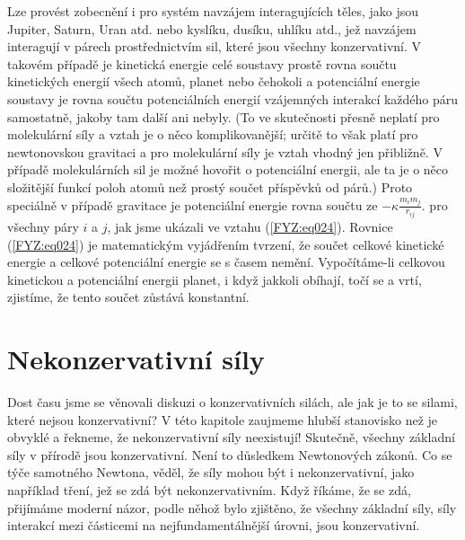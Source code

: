 {    Lze provést zobecnění i pro systém navzájem interagujících těles, jako jsou Jupiter, Saturn, 
    Uran atd. nebo kyslíku, dusíku, uhlíku atd., jež navzájem interagují v párech prostřednictvím 
    sil, které jsou všechny konzervativní. V takovém případě je kinetická energie celé soustavy 
    prostě rovna součtu kinetických energií všech atomů, planet nebo čehokoli a potenciální energie 
    soustavy je rovna součtu potenciálních energií vzájemných interakcí každého páru samostatně, 
    jakoby tam další ani nebyly. (To ve skutečnosti přesně neplatí pro molekulární síly a vztah je 
    o něco komplikovanější; určitě to však platí pro newtonovskou gravitaci a pro molekulární síly 
    je vztah vhodný jen přibližně. V případě molekulárních sil je možné hovořit o potenciální 
    energii, ale ta je o něco složitější funkcí poloh atomů než prostý součet příspěvků od párů.) 
    Proto speciálně v případě gravitace je potenciální energie rovna součtu ze \(- \kappa 
    \frac{m_im_j}{r_{ij}}.\) pro všechny páry \(i\) a \(j\), jak jsme ukázali ve vztahu 
    (\ref{FYZ:eq024}). Rovnice (\ref{FYZ:eq024}) je matematickým vyjádřením tvrzení, že součet 
    celkové kinetické energie a celkové potenciální energie se s časem nemění. Vypočítáme-li 
    celkovou kinetickou a potenciální energii planet, i když jakkoli obíhají, točí se a vrtí, 
    zjistíme, že tento součet zůstává konstantní.
    
  \section{Nekonzervativní síly}
    Dost času jsme se věnovali diskuzi o konzervativních silách, ale jak je to se silami, které 
    nejsou konzervativní? V této kapitole zaujmeme hlubší stanovisko než je obvyklé a řekneme, že 
    nekonzervativní síly neexistují! Skutečně, všechny základní síly v přírodě jsou konzervativní. 
    Není to důsledkem Newtonových zákonů. Co se týče samotného Newtona, věděl, že síly mohou být i 
    nekonzervativní, jako například tření, jež se zdá být nekonzervativním. Když říkáme, že se zdá, 
    přijímáme moderní názor, podle něhož bylo zjištěno, že všechny základní síly, síly interakcí 
    mezi částicemi na nejfundamentálnější úrovni, jsou konzervativní.
    
}

